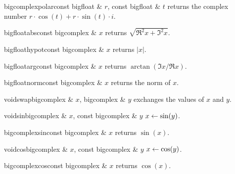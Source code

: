 \begin{fcode}{bigcomplex}{polar}{const bigfloat & $r$, const bigfloat & $t$}
  returns the complex number $r \cdot \cos(t) + r \cdot \sin(t) \cdot i$.
\end{fcode}

\begin{fcode}{bigfloat}{abs}{const bigcomplex & $x$}
  returns $\sqrt{\Re^2 x + \Im^2 x}$.
\end{fcode}

\begin{fcode}{bigfloat}{hypot}{const bigcomplex & $x$}
  returns $|x|$.
\end{fcode}

\begin{fcode}{bigfloat}{arg}{const bigcomplex & $x$}
  returns $\arctan(\Im x / \Re x)$.
\end{fcode}

\begin{fcode}{bigfloat}{norm}{const bigcomplex & $x$}
  returns the norm of $x$.
\end{fcode}

\begin{fcode}{void}{swap}{bigcomplex & $x$, bigcomplex & $y$}
  exchanges the values of $x$ and $y$.
\end{fcode}




\begin{fcode}{void}{sin}{bigcomplex & $x$, const bigcomplex & $y$}
  $x \leftarrow \sin(y)$.
\end{fcode}

\begin{fcode}{bigcomplex}{sin}{const bigcomplex & $x$}
  returns $\sin(x)$.
\end{fcode}

\begin{fcode}{void}{cos}{bigcomplex & $x$, const bigcomplex & $y$}
  $x \leftarrow \cos(y)$.
\end{fcode}

\begin{fcode}{bigcomplex}{cos}{const bigcomplex & $x$}
  returns $\cos(x)$.
\end{fcode}




